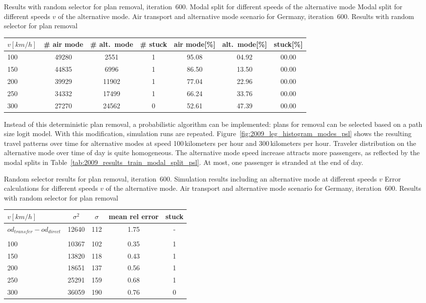 %
\createtable%
{Results with random selector for plan removal, iteration~600. Modal split for different speeds of the alternative mode}%
{Modal split for different speeds $v$ of the alternative mode. %
Air transport and alternative mode scenario for Germany, iteration~600. %
Results with random selector for plan removal%
}%
{\label{tab:2009_results_train_modal_split_psl}}%
{%
  \begin{tabular}{@{}l|ccc|ccc@{}}
		$v [km/h]$	& \# air mode  & \# alt.~mode & \# stuck & air mode[\%]  & alt.~mode[\%] & stuck[\%] \\
		\hline 
		100 & 49280 & 2551 & 1 & 95.08 & 04.92 & 00.00\\	%
		150 & 44835 & 6996 & 1 & 86.50 & 13.50 & 00.00\\	%
		200 & 39929 & 11902 & 1 & 77.04 & 22.96 & 00.00\\	%
		250 & 34332 & 17499 & 1 & 66.24 & 33.76 & 00.00\\	%
		300 & 27270 & 24562 & 0 & 52.61 & 47.39 & 00.00\\	%
	\end{tabular}
}%
{}

Instead of this deterministic plan removal, a probabilistic algorithm can be implemented: \eg plans for removal can be selected based on a path size logit model. 
With this modification, simulation runs are repeated. 
Figure~\ref{fig:2009_leg_histogram_modes_psl} shows the resulting travel patterns over time for alternative modes at speed 100\,kilometers per hour and 300\,kilometers per hour.  
Traveler distribution on the alternative mode over time of day is quite homogeneous. 
The alternative mode speed increase attracts more passengers, as 
reflected by the modal splits in Table~\ref{tab:2009_results_train_modal_split_psl}. 
At most, one passenger is stranded at the end of day. 

\createtable%
{Random selector results for plan removal, iteration~600. Simulation results including an alternative mode at different speeds $v$}%
{%
Error calculations for different speeds $v$ of the alternative mode. %
Air transport and alternative mode scenario for Germany, iteration~600. %
Results with random selector for plan removal%
}%
{\label{tab:2009_results_alternative_mode_psl}}%
{%
  \begin{tabular}{@{}l|cccc@{}}
			$v [km/h]$ & $\sigma^2$ & $\sigma$ & mean rel error  & stuck \\
\hline
 $od_{transfer} - od_{direct}$ &  12640 & 112 & 1.75 & - \\
 \\
 100	& 10367 & 102 & 0.35 &  1 \\	%
 150	& 13820 & 118 & 0.43 &  1 \\	%
 200 & 18651 & 137 & 0.56 &  1 \\	%
 250 & 25291 & 159 & 0.68 & 1 \\	%
 300 & 36059 & 190 & 0.76 & 0 \\	%
		\end{tabular}
}%
{}

